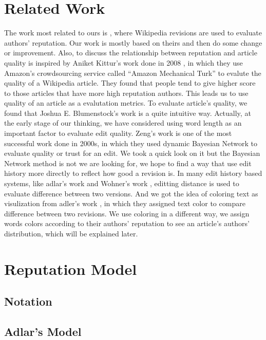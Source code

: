 \documentclass[preprint,review,12pt]{elsarticle}
\begin{document}
\section{Related Work}
The work most related to ours is \cite{adler2007content}, where Wikipedia
revisions are used to evaluate authors' reputation. Our work is mostly based on
theirs and then do some change or improvement. Also, to discuss the relationship
between reputation and article quality is inspired by Aniket Kittur's work done
in 2008 \cite{kittur2008can}, in which they use Amazon's crowdsourcing service
called ``Amazon Mechanical Turk'' to evalute the quality of a Wikipedia article.
They found that people tend to give higher score to those articles that have
more high reputation authors. This leads us to use quality of an article as a
evalutation metrics. To evaluate article's quality, we found that Joshua E.
Blumenstock's work \cite{blumenstock2008size} is a quite intuitive way.
Actually, at the early stage of our thinking, we have considered using word
length as an important factor to evaluate edit quality. Zeng's work
\cite{zeng2006computing} is one of the most successful work done in 2000s, in
which they used dynamic Bayesian Network to evaluate quality or trust for an edit. We
took a quick look on it but the Bayesian Network method is not we are looking
for, we hope to find a way that use edit history more directly to reflect how
good a revision is. In many edit history based systems, like adlar's work
\cite{adler2007content} and Wohner's work \cite{wohner2009assessing}, editting
distance is used to evaluate difference between two versions. And we got the
idea of coloring text as visulization from adler's work
\cite{adler2008assigning}, in which they assigned text color to compare
difference between two revisions. We use coloring in a different way, we assign
words colors according to their authors' reputation to see an article's authors'
distribution, which will be explained later.



\section{Reputation Model}
\subsection{Notation}
\subsection{Adlar's Model}
\end{document}
